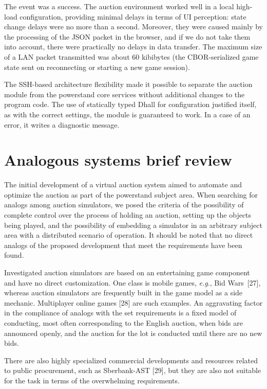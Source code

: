 \documentclass[
]{ceurart}
\begin{document}
The event was a success. The auction environment worked well in a local high-load configuration, providing minimal delays in terms of UI perception: state change delays were no more than a second. Moreover, they were caused mainly by the processing of the JSON packet in the browser, and if we do not take them into account, there were practically no delays in data transfer. The maximum size of a LAN packet transmitted was about 60 kibibytes (the CBOR-serialized game state sent on reconnecting or starting a new game session).

The SSH-based architecture flexibility made it possible to separate the auction module from the powerstand core services without additional changes to the program code. The use of statically typed Dhall for configuration ​​justified itself, as with the correct settings, the module is guaranteed to work. In a case of an error, it writes a diagnostic message.

\section{Analogous systems brief review}
\label{sec:analogs}

The initial development of a virtual auction system aimed to automate and optimize the auction as part of the powerstand subject area. When searching for analogs among auction simulators, we posed the criteria of the possibility of complete control over the process of holding an auction, setting up the objects being played, and the possibility of embedding a simulator in an arbitrary subject area with a distributed scenario of operation. It should be noted that no direct analogs of the proposed development that meet the requirements have been found.

Investigated auction simulators are based on an entertaining game component and have no direct customization. One class is mobile games, \emph{e.g}., Bid Wars~[27], whereas auction simulators are frequently built in the game model as a side mechanic. Multiplayer online games [28] are such examples. An aggravating factor in the compliance of analogs with the set requirements is a fixed model of conducting, most often corresponding to the English auction, when bids are announced openly, and the auction for the lot is conducted until there are no new bids.

There are also highly specialized commercial developments and resources related to public procurement, such as Sberbank-AST [29], but they are also not suitable for the task in terms of the overwhelming requirements.
\end{document}
